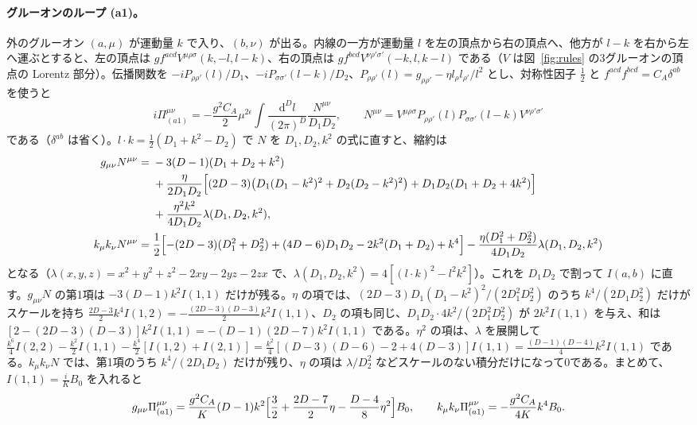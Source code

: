\documentclass[a4paper,10pt]{ltjsarticle}
\newcommand{\dd}{\mathrm{d}}
\begin{document}
\paragraph{グルーオンのループ (a1)。}外のグルーオン $(a,\mu)$ が運動量 $k$ で入り、$(b,\nu)$ が出る。内線の一方が運動量 $l$ を左の頂点から右の頂点へ、他方が $l-k$ を右から左へ運ぶとすると、左の頂点は $gf^{acd}V^{\mu\rho\sigma}(k,-l,l-k)$、右の頂点は $gf^{bcd}V^{\nu\rho'\sigma'}(-k,l,k-l)$ である（$V$ は図~\ref{fig:rules} の3グルーオンの頂点の Lorentz 部分）。伝播関数を $-iP_{\rho\rho'}(l)/D_1$、$-iP_{\sigma\sigma'}(l-k)/D_2$、$P_{\rho\rho'}(l)=g_{\rho\rho'}-\eta l_\rho l_{\rho'}/l^2$ とし、対称性因子 $\frac12$ と $f^{acd}f^{bcd}=C_A\delta^{ab}$ を使うと
\begin{equation*}
i\Pi^{\mu\nu}_{(a1)}=-\frac{g^2C_A}{2}\mu^{2\epsilon}\int\frac{\dd^Dl}{(2\pi)^D}\frac{N^{\mu\nu}}{D_1D_2},\qquad
N^{\mu\nu}=V^{\mu\rho\sigma}P_{\rho\rho'}(l)P_{\sigma\sigma'}(l-k)V^{\nu\rho'\sigma'}
\end{equation*}
である（$\delta^{ab}$ は省く）。$l\cdot k=\frac12(D_1+k^2-D_2)$ で $N$ を $D_1,D_2,k^2$ の式に直すと、縮約は
\begin{equation*}
\begin{aligned}
g_{\mu\nu}N^{\mu\nu}={}&-3(D-1)(D_1+D_2+k^2)\\
&+\frac{\eta}{2D_1D_2}\Bigl[(2D-3)\bigl(D_1(D_1-k^2)^2+D_2(D_2-k^2)^2\bigr)+D_1D_2(D_1+D_2+4k^2)\Bigr]\\
&+\frac{\eta^2k^2}{4D_1D_2}\lambda(D_1,D_2,k^2),\\
k_\mu k_\nu N^{\mu\nu}={}&\frac12\Bigl[-(2D-3)(D_1^2+D_2^2)+(4D-6)D_1D_2-2k^2(D_1+D_2)+k^4\Bigr]-\frac{\eta(D_1^2+D_2^2)}{4D_1D_2}\lambda(D_1,D_2,k^2)
\end{aligned}
\end{equation*}
となる（$\lambda(x,y,z)=x^2+y^2+z^2-2xy-2yz-2zx$ で、$\lambda(D_1,D_2,k^2)=4[(l\cdot k)^2-l^2k^2]$）。これを $D_1D_2$ で割って $I(a,b)$ に直す。$g_{\mu\nu}N$ の第1項は $-3(D-1)k^2I(1,1)$ だけが残る。$\eta$ の項では、$(2D-3)D_1(D_1-k^2)^2/(2D_1^2D_2^2)$ のうち $k^4/(2D_1D_2^2)$ だけがスケールを持ち $\frac{2D-3}2k^4I(1,2)=-\frac{(2D-3)(D-3)}2k^2I(1,1)$、$D_2$ の項も同じ、$D_1D_2\cdot4k^2/(2D_1^2D_2^2)$ が $2k^2I(1,1)$ を与え、和は $[2-(2D-3)(D-3)]k^2I(1,1)=-(D-1)(2D-7)k^2I(1,1)$ である。$\eta^2$ の項は、$\lambda$ を展開して $\frac{k^6}{4}I(2,2)-\frac{k^2}2I(1,1)-\frac{k^4}{2}[I(1,2)+I(2,1)]=\frac{k^2}4[(D-3)(D-6)-2+4(D-3)]I(1,1)=\frac{(D-1)(D-4)}4k^2I(1,1)$ である。$k_\mu k_\nu N$ では、第1項のうち $k^4/(2D_1D_2)$ だけが残り、$\eta$ の項は $\lambda/D_2^2$ などスケールのない積分だけになって0である。まとめて、$I(1,1)=\frac iKB_0$ を入れると
\begin{equation*}
g_{\mu\nu}\Pi^{\mu\nu}_{(a1)}=\frac{g^2C_A}{K}(D-1)k^2\Bigl[\frac32+\frac{2D-7}{2}\eta-\frac{D-4}{8}\eta^2\Bigr]B_0,\qquad
k_\mu k_\nu\Pi^{\mu\nu}_{(a1)}=-\frac{g^2C_A}{4K}k^4B_0.
\end{equation*}
\end{document}
